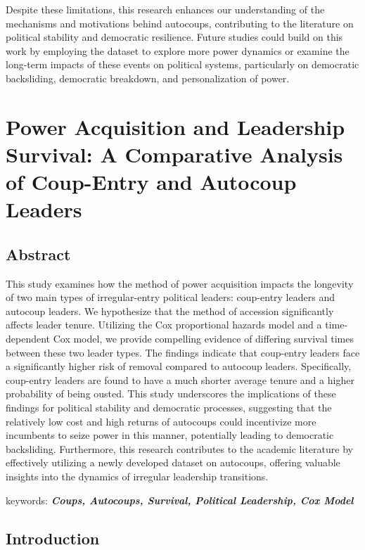 \documentclass[
  12pt,
]{report}
\begin{document}
Despite these limitations, this research enhances our understanding of
the mechanisms and motivations behind autocoups, contributing to the
literature on political stability and democratic resilience. Future
studies could build on this work by employing the dataset to explore
more power dynamics or examine the long-term impacts of these events on
political systems, particularly on democratic backsliding, democratic
breakdown, and personalization of power.

\chapter{Power Acquisition and Leadership Survival: A Comparative
Analysis of Coup-Entry and Autocoup
Leaders}\label{power-acquisition-and-leadership-survival-a-comparative-analysis-of-coup-entry-and-autocoup-leaders}

\section*{Abstract}\label{abstract-2}

This study examines how the method of power acquisition impacts the
longevity of two main types of irregular-entry political leaders:
coup-entry leaders and autocoup leaders. We hypothesize that the method
of accession significantly affects leader tenure. Utilizing the Cox
proportional hazards model and a time-dependent Cox model, we provide
compelling evidence of differing survival times between these two leader
types. The findings indicate that coup-entry leaders face a
significantly higher risk of removal compared to autocoup leaders.
Specifically, coup-entry leaders are found to have a much shorter
average tenure and a higher probability of being ousted. This study
underscores the implications of these findings for political stability
and democratic processes, suggesting that the relatively low cost and
high returns of autocoups could incentivize more incumbents to seize
power in this manner, potentially leading to democratic backsliding.
Furthermore, this research contributes to the academic literature by
effectively utilizing a newly developed dataset on autocoups, offering
valuable insights into the dynamics of irregular leadership transitions.

keywords: \textbf{\emph{Coups, Autocoups, Survival, Political
Leadership, Cox Model}}

\newpage

\section{Introduction}\label{introduction-3}
\end{document}
